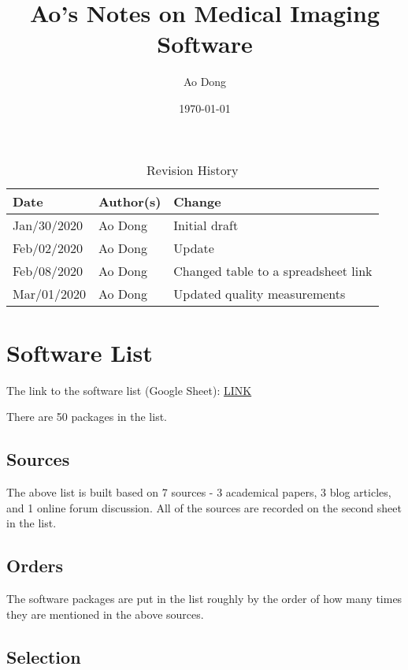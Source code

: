 \documentclass{article}
\title{Ao's Notes on Medical Imaging Software}
\author{Ao Dong}
\date{\today}
\theoremstyle{definition}
\begin{document}
\maketitle

\begin{table}[hp]
\caption{Revision History} \label{TblRevisionHistory}
\begin{tabularx}{\textwidth}{llX}
\toprule
\textbf{Date} & \textbf{Author(s)} & \textbf{Change}\\
\midrule
Jan/30/2020 & Ao Dong & Initial draft\\
Feb/02/2020 & Ao Dong & Update\\
Feb/08/2020 & Ao Dong & Changed table to a spreadsheet link\\
Mar/01/2020 & Ao Dong & Updated quality measurements\\
\bottomrule
\end{tabularx}
\end{table}

\section{Software List}

The link to the software list (Google Sheet):
\href{https://docs.google.com/spreadsheets/d/122wU0v3ZtvDcqy8C4zKJ89kU-8fXAbo3Mzn6vcVXOi0/edit?usp=sharing}{LINK}

\noindent There are 50 packages in the list.

\subsection{Sources}

The above list is built based on 7 sources - 3 academical papers, 3 blog
articles, and 1 online forum discussion. All of the sources are recorded on the
second sheet in the list.

\subsection{Orders}

The software packages are put in the list roughly by the order of how many times
they are mentioned in the above sources.

\subsection{Selection}
\end{document}
